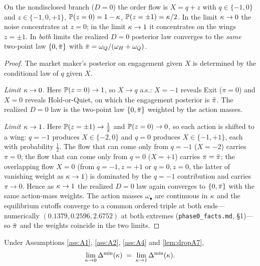 \begin{lemma}
\label{lem:endpoint-info}
On the nondisclosed branch ($D=0$) the order flow is $X=q+z$ with
$q\in\{-1,0\}$ and $z\in\{-1,0,+1\}$, $\mathbb{P}(z=0)=1-\kappa$, $\mathbb{P}(z=\pm1)=\kappa/2$. In
the limit $\kappa\to0$ the noise concentrates at $z=0$; in the limit $\kappa\to1$ it
concentrates on the wings $z=\pm1$. In \emph{both} limits the realized $D=0$
posterior law converges to the \emph{same} two-point law $\{0,\bar{\pi}\}$ with
$\bar{\pi}=\omega_Q/(\omega_H+\omega_Q)$.
\end{lemma}

\begin{proof}
The market maker's posterior on engagement given $X$ is determined by the
conditional law of $q$ given $X$.

\emph{Limit $\kappa\to0$.} Here $\mathbb{P}(z=0)\to1$, so $X\to q$ a.s.: $X=-1$ reveals Exit
($\pi=0$) and $X=0$ reveals Hold-or-Quiet, on which the engagement posterior is
$\bar{\pi}$. The realized $D=0$ law is the two-point law $\{0,\bar{\pi}\}$ weighted by
the action masses.

\emph{Limit $\kappa\to1$.} Here $\mathbb{P}(z=\pm1)\to\tfrac12$ and $\mathbb{P}(z=0)\to0$, so each
action is shifted to a wing: $q=-1$ produces $X\in\{-2,0\}$ and $q=0$ produces
$X\in\{-1,+1\}$, each with probability $\tfrac12$. The flow that can come only
from $q=-1$ ($X=-2$) carries $\pi=0$; the flow that can come only from $q=0$
($X=+1$) carries $\pi=\bar{\pi}$; the overlapping flow $X=0$ (from $q=-1,z=+1$ or
$q=0,z=0$, the latter of vanishing weight as $\kappa\to1$) is dominated by the
$q=-1$ contribution and carries $\pi\to0$. Hence as $\kappa\to1$ the realized $D=0$
law again converges to $\{0,\bar{\pi}\}$ with the same action-mass weights. The
action masses $\omega_\bullet$ are continuous in $\kappa$ and the equilibrium
cutoffs converge to a common ordered triple at both ends---numerically
$(0.1379,0.2596,2.6752)$ at both extremes (\texttt{phase0\_facts.md}, \S1)---so
$\bar{\pi}$ and the weights coincide in the two limits.
\end{proof}

\begin{proposition}
\label{prop:endpoint-symmetry}
Under Assumptions \ref{ass:A1}, \ref{ass:A2}, \ref{ass:A4} and \ref{lem:dropA7},
\begin{equation}
\label{eq:endpoint-eq}
\lim_{\kappa\to0}\Delta^{\min}(\kappa)\;=\;\lim_{\kappa\to1}\Delta^{\min}(\kappa).
\end{equation}
\end{proposition}

